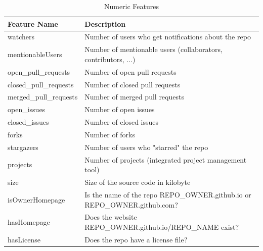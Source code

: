 \begin{table}[h]
\centering
\caption{Numeric Features}
\label{features}
\begin{tabularx}{\linewidth}{|l|X|}
\hline
Feature Name           & Description                                                                        \\ \hline
watchers               & Number of users who get notifications about the repo                               \\ \hline
mentionableUsers       & Number of mentionable users (collaborators, contributors, ...)                     \\ \hline
open\_pull\_requests   & Number of open pull requests                                                       \\ \hline
closed\_pull\_requests & Number of closed pull requests                                                     \\ \hline
merged\_pull\_requests & Number of merged pull requests                                                     \\ \hline
open\_issues           & Number of open issues                                                              \\ \hline
closed\_issues         & Number of closed issues                                                            \\ \hline
forks                  & Number of forks                                                                    \\ \hline
stargazers             & Number of users who "starred" the repo                                             \\ \hline
projects               & Number of projects (integrated project management tool)                            \\ \hline
size                   & Size of the source code in kilobyte                                                \\ \hline
isOwnerHomepage        & Is the name of the repo REPO\_OWNER.github.io or REPO\_OWNER.github.com?           \\ \hline
hasHomepage            & Does the website \newline{}REPO\_OWNER.github.io/REPO\_NAME exist?                 \\ \hline
hasLicense             & Does the repo have a license file?                                                 \\ \hline

\end{tabularx}
\end{table}

